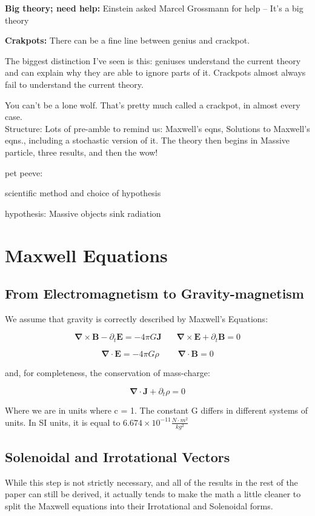 \documentclass {article}
\renewcommand\vec{\mathbf}
\let\OldS\nabla
\renewcommand{\nabla}{\boldsymbol{\OldS}}
\begin{document}
\textbf{Big theory; need help:} Einstein asked Marcel Grossmann for help -- It's a big theory

\vspace{10pt}

\textbf{Crakpots:} There can be a fine line between genius and crackpot.

The biggest distinction I’ve seen is this: geniuses understand the current theory and can explain why they are able to ignore parts of it. Crackpots almost always fail to understand the current theory.

You can’t be a lone wolf. That’s pretty much called a crackpot, in almost every case.
\\[0.5in]

Structure: Lots of pre-amble to remind us: Maxwell's eqns, Solutions to Maxwell's eqns., including a stochastic version of it. The theory then begins in Massive particle, three results, and then the wow!

pet peeve:

scientific method and choice of hypothesis

hypothesis: Massive objects sink radiation


\newpage


\section{Maxwell Equations}
\subsection{From Electromagnetism to Gravity-magnetism}



We assume that gravity is correctly described by Maxwell's Equations:

$$\nabla \times \vec B  - \partial_t \vec E  = -4 \pi G \vec J ~~~~~~~~ \nabla \times \vec E + \partial_t \vec B = 0    $$

$$\nabla \cdot \vec E = -4 \pi G \rho ~~~~~~~~~~ \nabla \cdot \vec B = 0   $$

and, for completeness, the conservation of mass-charge:

$$\nabla \cdot \vec J + \partial_t \rho = 0 $$

Where we are in units where c = 1. The constant G differs in different systems of units. In SI units, it is equal to $6.674 \times 10^{-11} \frac {N \cdot m^2}{kg^2}$ 

\newpage 
\subsection{Solenoidal and Irrotational Vectors}
While this step is not strictly necessary, and all of the results in the rest of the paper can still be derived, it actually tends to make the math a little cleaner to split the Maxwell equations into their Irrotational and Solenoidal forms.
\end{document}
